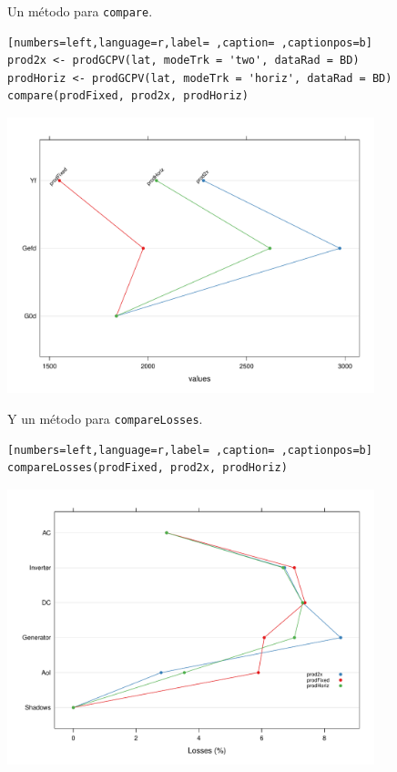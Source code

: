 Un método para \texttt{compare}.
\begin{lstlisting}[numbers=left,language=r,label= ,caption= ,captionpos=b]
prod2x <- prodGCPV(lat, modeTrk = 'two', dataRad = BD)
prodHoriz <- prodGCPV(lat, modeTrk = 'horiz', dataRad = BD)
compare(prodFixed, prod2x, prodHoriz)
\end{lstlisting}

\begin{center}
\includegraphics[width=0.8\textwidth]{figuras/codigo-prodgcpv2.pdf}
\end{center}

Y un método para \texttt{compareLosses}.
\begin{lstlisting}[numbers=left,language=r,label= ,caption= ,captionpos=b]
compareLosses(prodFixed, prod2x, prodHoriz)
\end{lstlisting}

\begin{center}
\includegraphics[width=0.8\textwidth]{figuras/codigo-prodgcpv3.pdf}
\end{center}

